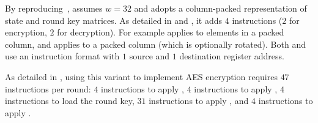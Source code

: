
By reproducing~\cite[Section 4.2]{TilGro:06},
assumes 
$w = 32$
and adopts a 
column-packed 
representation of state and round key matrices.
As detailed in
and
,
it adds
$ 4$
instructions ($2$ for encryption, $2$ for decryption).
For example
applies   to elements in a packed column,
and
applies  to             a packed column (which is optionally rotated).
Both 
and
use an instruction format with $1$ source and $1$ destination register address.

As detailed in
,
using this variant to implement AES encryption requires
$47$
instructions per round:
$ 4$  instructions to apply ,
$ 4$  instructions to apply ,
$ 4$           instructions to load the round key,
$31$                     instructions to apply ,
and
$ 4$           instructions to apply .

